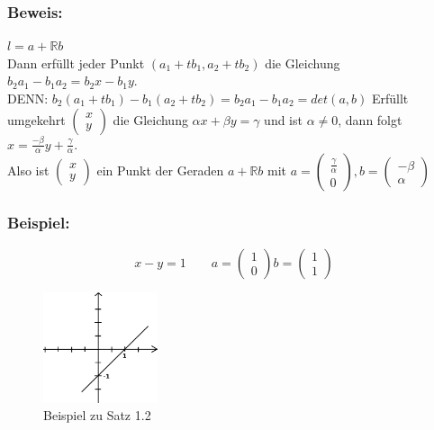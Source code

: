 \subsubsection{Beweis:}
$l=a + \mathbb{R}b$\\
Dann erfüllt jeder Punkt $(a_{1}+tb_{1},a_{2}+tb_{2})$ die Gleichung $b_{2}a_{1}-b_{1}a_{2} = b_{2}x-b_{1}y$.\\
DENN:  $b_{2}(a_{1}+tb_{1})-b_{1}(a_{2}+tb_{2})=b_{2}a_{1}-b_{1}a_{2}=det(a,b)$ Erfüllt umgekehrt $\begin{pmatrix}x \\ y \end{pmatrix}$ die Gleichung $\alpha x + \beta y = \gamma$ und ist $\alpha \neq 0$, dann folgt $x=\frac{-\beta}{\alpha}y+\frac{\gamma}{\alpha}$. \\ 
Also ist $\begin{pmatrix}x \\ y \end{pmatrix}$ ein Punkt der Geraden $a + \mathbb{R}b$ mit $a=\begin{pmatrix} \frac{\gamma}{\alpha} \\ 0 \end{pmatrix}, b=\begin{pmatrix} -\beta \\ \alpha \end{pmatrix}$\\
%
%
%
\subsubsection{Beispiel:} 
\begin{equation*}
x-y=1 \qquad a=\begin{pmatrix} 1 \\ 0 \end{pmatrix} b=\begin{pmatrix} 1 \\ 1 \end{pmatrix}
\end{equation*}
\begin{figure}[H]
	\centering
	\includegraphics[width=0.3\textwidth]
	{mainmatter/chapter1/pics/bsp12.png}
	\caption{Beispiel zu Satz 1.2} 
\end{figure}